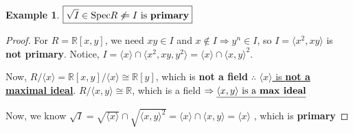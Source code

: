 \documentclass[12pt,a4paper]{article}
\theoremstyle{definition}
\newtheorem{example}{Example}
\begin{document}
\begin{example}
  $\boxed{\sqrt{I} \in \text{Spec}R \not\Leftarrow I \text{ is \textbf{primary}}}$
\end{example}

\begin{proof}
  For $R = \mathbb{R}[x, y]$, we need $xy \in I$ and $x \notin I \Rightarrow y^n \in I$, so $\boxed{I = \langle x^2, xy \rangle}$ is \textbf{not primary}. Notice, $I = \langle x \rangle \cap \langle x^2, xy, y^2 \rangle = \langle x \rangle \cap \langle x, y \rangle^2$.\newline
  
  \noindent Now, $R/\langle x \rangle = \mathbb{R}[x, y]/\langle x \rangle \cong \mathbb{R}[y]$, which is \textbf{not a field} $\therefore$ \underline{$\langle x \rangle$ is \textbf{not a maximal ideal}}.
  $R/\langle x, y \rangle \cong \mathbb{R}$, which is a field $\Rightarrow \underline{\langle x, y \rangle \text{ is a \textbf{max ideal}}}$\newline

  \noindent Now, we know $\boxed{\sqrt{I}} = \sqrt{\langle x \rangle} \cap \sqrt{\langle x, y \rangle^2} = \langle x \rangle \cap \langle x, y \rangle = \boxed{\langle x \rangle}$ , which is \textbf{primary}
\end{proof}
\vspace{0.125em}
\end{document}
